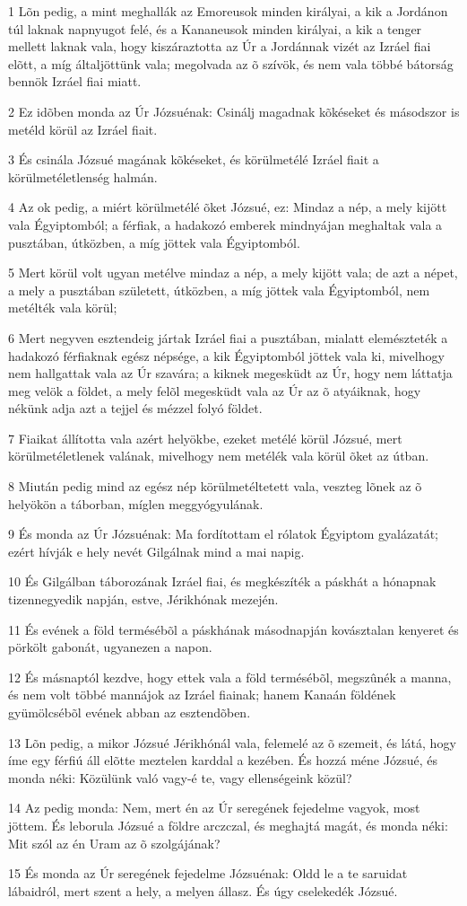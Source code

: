 \par 1 Lõn pedig, a mint meghallák az Emoreusok minden királyai, a kik a Jordánon túl laknak napnyugot felé, és a Kananeusok minden királyai, a kik a tenger mellett laknak vala, hogy kiszáraztotta az Úr a Jordánnak vizét az Izráel fiai elõtt, a míg általjöttünk vala; megolvada az õ szívök,  és nem vala többé bátorság bennök Izráel fiai miatt.
\par 2 Ez idõben monda az Úr Józsuénak: Csinálj magadnak kõkéseket és másodszor  is metéld körül az Izráel fiait.
\par 3 És csinála Józsué magának kõkéseket, és körülmetélé Izráel fiait a körülmetéletlenség halmán.
\par 4 Az ok pedig, a miért körülmetélé õket Józsué, ez: Mindaz a nép, a mely kijött vala Égyiptomból; a férfiak, a hadakozó emberek mindnyájan meghaltak vala a pusztában, útközben, a míg jöttek vala Égyiptomból.
\par 5 Mert körül volt ugyan metélve mindaz a nép, a mely kijött vala; de azt a népet, a mely a pusztában született, útközben, a míg jöttek vala Égyiptomból, nem metélték vala körül;
\par 6 Mert negyven esztendeig jártak Izráel fiai a pusztában, mialatt elemészteték  a hadakozó férfiaknak egész népsége, a kik Égyiptomból jöttek vala ki, mivelhogy nem hallgattak vala az Úr szavára; a kiknek megesküdt az Úr, hogy nem láttatja meg velök a földet, a mely felõl megesküdt vala az Úr az õ atyáiknak, hogy nékünk adja azt a tejjel és mézzel folyó földet.
\par 7 Fiaikat állította vala azért helyökbe, ezeket metélé körül Józsué, mert körülmetéletlenek valának, mivelhogy nem metélék vala körül õket az útban.
\par 8 Miután pedig mind az egész nép körülmetéltetett vala, veszteg lõnek az õ helyökön a táborban, míglen meggyógyulának.
\par 9 És monda az Úr Józsuénak: Ma fordítottam el rólatok Égyiptom gyalázatát; ezért hívják e hely nevét Gilgálnak mind a mai napig.
\par 10 És Gilgálban táborozának Izráel fiai, és megkészíték a páskhát a hónapnak tizennegyedik napján, estve, Jérikhónak mezején.
\par 11 És evének a föld termésébõl a páskhának másodnapján kovásztalan kenyeret és pörkölt gabonát, ugyanezen a napon.
\par 12 És másnaptól kezdve, hogy ettek vala a föld termésébõl, megszûnék a manna, és nem volt többé mannájok az Izráel fiainak; hanem Kanaán földének gyümölcsébõl evének abban az esztendõben.
\par 13 Lõn pedig, a mikor Józsué Jérikhónál vala, felemelé az õ szemeit, és látá, hogy íme egy férfiú áll elõtte meztelen karddal a kezében. És hozzá méne Józsué, és monda néki: Közülünk való vagy-é te, vagy ellenségeink közül?
\par 14 Az pedig monda: Nem, mert én az Úr seregének fejedelme vagyok, most jöttem. És leborula Józsué a földre arczczal, és meghajtá magát, és monda néki: Mit szól az én Uram az õ szolgájának?
\par 15 És monda az Úr seregének fejedelme Józsuénak: Oldd le a te saruidat lábaidról, mert szent a hely, a melyen állasz. És úgy cselekedék Józsué.

